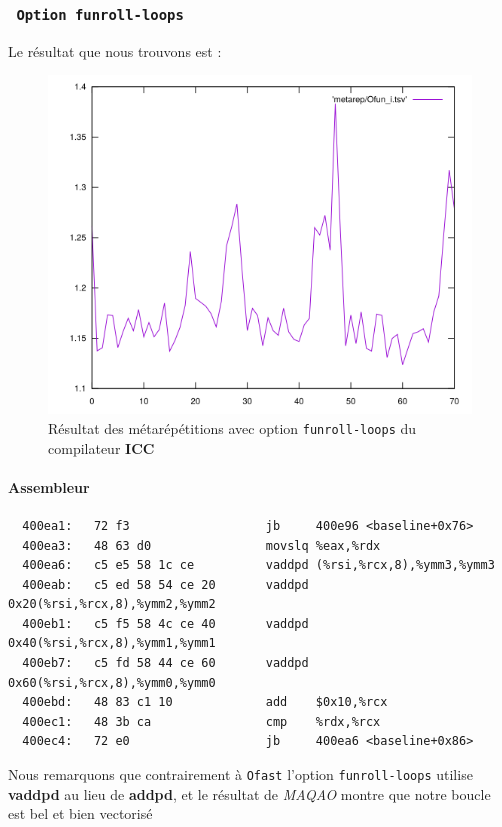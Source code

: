 \documentclass{report}
\begin{document}
      \subsubsection{\texttt{ Option funroll-loops}}
        Le résultat que nous trouvons est :
        \begin{figure}[ht!]
          \centering
          \includegraphics[scale=0.45]{resources/L1/metarep/Ofun_i.png}
          \caption{Résultat des métarépétitions avec option \texttt{funroll-loops} du compilateur \textbf{ICC}}
        \end{figure}
        \paragraph{Assembleur}
          \begin{tcolorbox}
            \begin{verbatim}
  400ea1:	72 f3                	jb     400e96 <baseline+0x76>
  400ea3:	48 63 d0             	movslq %eax,%rdx
  400ea6:	c5 e5 58 1c ce       	vaddpd (%rsi,%rcx,8),%ymm3,%ymm3
  400eab:	c5 ed 58 54 ce 20    	vaddpd 0x20(%rsi,%rcx,8),%ymm2,%ymm2
  400eb1:	c5 f5 58 4c ce 40    	vaddpd 0x40(%rsi,%rcx,8),%ymm1,%ymm1
  400eb7:	c5 fd 58 44 ce 60    	vaddpd 0x60(%rsi,%rcx,8),%ymm0,%ymm0
  400ebd:	48 83 c1 10          	add    $0x10,%rcx
  400ec1:	48 3b ca             	cmp    %rdx,%rcx
  400ec4:	72 e0                	jb     400ea6 <baseline+0x86>
          \end{verbatim}
        \end{tcolorbox}
        Nous remarquons que contrairement à \texttt{Ofast} l'option \texttt{funroll-loops} utilise \textbf{vaddpd}
        au lieu de \textbf{addpd}, et le résultat de \textit{MAQAO} montre que notre boucle est bel et bien vectorisé
\end{document}
